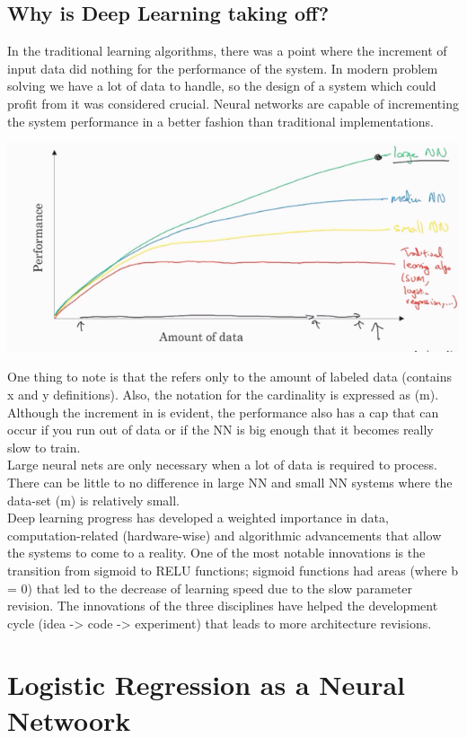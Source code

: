 \documentclass[11pt]{report}
\begin{document}
\subsection{Why is Deep Learning taking off?}
In the traditional learning algorithms, there was a point where the increment of input data did nothing for the performance of the system. In modern problem solving we have a lot of data to handle, so the design of a system which could profit from it was considered crucial. Neural networks are capable of incrementing the system performance in a better fashion than traditional implementations. 
\begin{center}
	\includegraphics[width = .50\textwidth]{PRGR.png}
\end{center}
One thing to note is that the  refers only to the amount of labeled data (contains x and y definitions). Also, the notation for the cardinality is expressed as (m).\\
Although the increment in  is evident, the performance also has a cap that can occur if you run out of data or if the NN is big enough that it becomes really slow to train.\\
Large neural nets are only necessary when a lot of data is required to process. There can be little to no difference in large NN and small NN systems where the data-set (m) is relatively small.\\
Deep learning progress has developed a weighted importance in data, computation-related (hardware-wise) and algorithmic advancements that allow the systems to come to a reality. One of the most notable innovations is the transition from sigmoid to RELU functions; sigmoid functions had areas (where b = 0) that led to the decrease of learning speed due to the slow parameter revision. The innovations of the three disciplines have helped the development cycle (idea -> code -> experiment) that leads to more architecture revisions.

\section{Logistic Regression as a Neural Netwoork}
\end{document}
